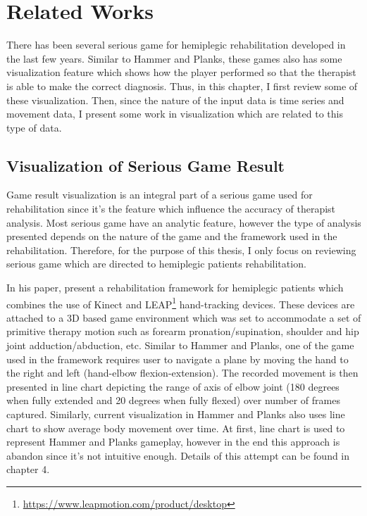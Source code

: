 \chapter{Related Works}
\label{chap:related}

There has been several serious game for hemiplegic rehabilitation developed in the last few years. Similar to Hammer and Planks, these games also has some visualization feature which shows how the player performed so that the therapist is able to make the correct diagnosis. Thus, in this chapter, I first review some of these visualization. Then, since the nature of the input data is time series and movement data, I present some work in visualization which are related to this type of data.

\section{Visualization of Serious Game Result} 

Game result visualization is an integral part of a serious game used for rehabilitation since it's the feature which influence the accuracy of therapist analysis. Most serious game have an analytic feature, however the type of analysis presented depends on the nature of the game and the framework used in the rehabilitation. Therefore, for the purpose of this thesis, I only focus on reviewing serious game which are directed to hemiplegic patients rehabilitation.

In his paper, \cite{rahman} present a rehabilitation framework for hemiplegic patients which combines the use of Kinect and LEAP\footnote{\url{https://www.leapmotion.com/product/desktop}} hand-tracking devices. These devices are attached to a 3D based game environment which was set to accommodate a set of primitive therapy motion such as forearm pronation/supination, shoulder and hip joint adduction/abduction, etc. Similar to Hammer and Planks, one of the game used in the framework requires user to navigate a plane by moving the hand to the right and left (hand-elbow flexion-extension). The recorded movement is then presented in line chart depicting the range of axis of elbow joint (180 degrees when fully extended and 20 degrees when fully flexed) over number of frames captured. Similarly, current visualization in Hammer and Planks also uses line chart to show average body movement over time. At first, line chart is used to represent Hammer and Planks gameplay, however in the end this approach is abandon since it's not intuitive enough. Details of this attempt can be found in chapter 4.

